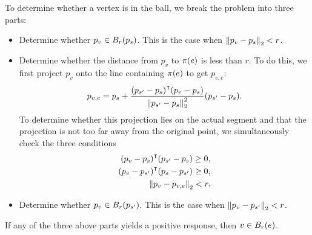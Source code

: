 To determine whether a vertex is in the ball, we break the problem into three parts: \begin{itemize}
	\item
	Determine whether \(p_v \in B_r\pof{p_s}\). This is the case when \(\norm{p_v - p_s}_2 < r\).

	\item
	Determine whether the distance from \(p_v\) to \(\pi\pof{e}\) is less than \(r\). To do this, we first project \(p_v\) onto the line containing \(\pi\pof{e}\) to get \(p_{v, e}\): \[p_{v, e} = p_s + \frac{\pof{p_{s'} - p_s}^\intercal\pof{p_v - p_s}}{\norm{p_{s'} - p_s}_2^2}\pof{p_{s'} - p_s}.\] To determine whether this projection lies on the actual segment and that the projection is not too far away from the original point, we simultaneously check the three conditions \begin{align*}
		\pof{p_v - p_s}^\intercal\pof{p_{s'} - p_s} \ge 0, \\
		\pof{p_v - p_{s'}}^\intercal\pof{p_s - p_{s'}} \ge 0, \\
		\norm{p_v - p_{v, e}}_2 < r.
	\end{align*}

	\item
	Determine whether \(p_v \in B_r\pof{p_{s'}}\). This is the case when \(\norm{p_v - p_{s'}}_2 < r\).
\end{itemize} If any of the three above parts yields a positive response, then \(v \in B_r\pof{e}\).




